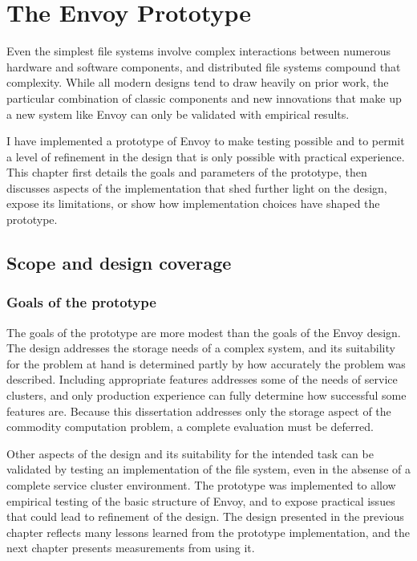 \chapter{The Envoy Prototype}

Even the simplest file systems involve complex interactions between numerous hardware and software components, and distributed file systems compound that complexity. While all modern designs tend to draw heavily on prior work, the particular combination of classic components and new innovations that make up a new system like Envoy can only be validated with empirical results.

I have implemented a prototype of Envoy to make testing possible and to permit a level of refinement in the design that is only possible with practical experience. This chapter first details the goals and parameters of the prototype, then discusses aspects of the implementation that shed further light on the design, expose its limitations, or show how implementation choices have shaped the prototype.

\section{Scope and design coverage}

\subsection{Goals of the prototype}

The goals of the prototype are more modest than the goals of the Envoy design. The design addresses the storage needs of a complex system, and its suitability for the problem at hand is determined partly by how accurately the problem was described. Including appropriate features addresses some of the needs of service clusters, and only production experience can fully determine how successful some features are. Because this dissertation addresses only the storage aspect of the commodity computation problem, a complete evaluation must be deferred.

Other aspects of the design and its suitability for the intended task can be validated by testing an implementation of the file system, even in the absense of a complete service cluster environment. The prototype was implemented to allow empirical testing of the basic structure of Envoy, and to expose practical issues that could lead to refinement of the design. The design presented in the previous chapter reflects many lessons learned from the prototype implementation, and the next chapter presents measurements from using it.

